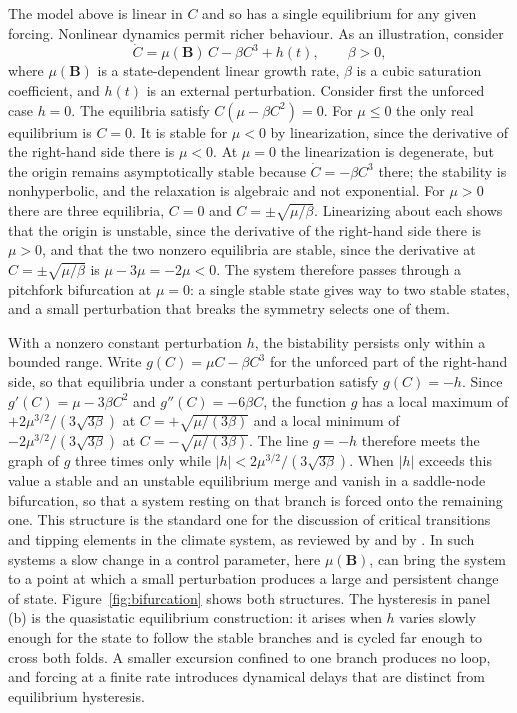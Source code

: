 \documentclass[11pt]{article}
\theoremstyle{definition}
\newcommand{\bB}{\mathbf{B}}
\begin{document}
The model above is linear in $C$ and so has a single equilibrium for any given forcing. Nonlinear dynamics permit richer behaviour. As an illustration, consider
\begin{equation}
\dot C = \mu(\bB)\,C - \beta C^3 + h(t), \qquad \beta > 0,
\label{eq:cubic}
\end{equation}
where $\mu(\bB)$ is a state-dependent linear growth rate, $\beta$ is a cubic saturation coefficient, and $h(t)$ is an external perturbation. Consider first the unforced case $h = 0$. The equilibria satisfy $C(\mu - \beta C^2) = 0$. For $\mu \le 0$ the only real equilibrium is $C = 0$. It is stable for $\mu < 0$ by linearization, since the derivative of the right-hand side there is $\mu < 0$. At $\mu = 0$ the linearization is degenerate, but the origin remains asymptotically stable because $\dot C = -\beta C^3$ there; the stability is nonhyperbolic, and the relaxation is algebraic and not exponential. For $\mu > 0$ there are three equilibria, $C = 0$ and $C = \pm\sqrt{\mu/\beta}$. Linearizing about each shows that the origin is unstable, since the derivative of the right-hand side there is $\mu > 0$, and that the two nonzero equilibria are stable, since the derivative at $C = \pm\sqrt{\mu/\beta}$ is $\mu - 3\mu = -2\mu < 0$. The system therefore passes through a pitchfork bifurcation at $\mu = 0$: a single stable state gives way to two stable states, and a small perturbation that breaks the symmetry selects one of them.

With a nonzero constant perturbation $h$, the bistability persists only within a bounded range. Write $g(C) = \mu C - \beta C^3$ for the unforced part of the right-hand side, so that equilibria under a constant perturbation satisfy $g(C) = -h$. Since $g'(C) = \mu - 3\beta C^2$ and $g''(C) = -6\beta C$, the function $g$ has a local maximum of $+2\mu^{3/2}/(3\sqrt{3\beta})$ at $C = +\sqrt{\mu/(3\beta)}$ and a local minimum of $-2\mu^{3/2}/(3\sqrt{3\beta})$ at $C = -\sqrt{\mu/(3\beta)}$. The line $g = -h$ therefore meets the graph of $g$ three times only while $|h| < 2\mu^{3/2}/(3\sqrt{3\beta})$. When $|h|$ exceeds this value a stable and an unstable equilibrium merge and vanish in a saddle-node bifurcation, so that a system resting on that branch is forced onto the remaining one. This structure is the standard one for the discussion of critical transitions and tipping elements in the climate system, as reviewed by \citet{lenton2008} and by \citet{scheffer2009}. In such systems a slow change in a control parameter, here $\mu(\bB)$, can bring the system to a point at which a small perturbation produces a large and persistent change of state. Figure~\ref{fig:bifurcation} shows both structures. The hysteresis in panel (b) is the quasistatic equilibrium construction: it arises when $h$ varies slowly enough for the state to follow the stable branches and is cycled far enough to cross both folds. A smaller excursion confined to one branch produces no loop, and forcing at a finite rate introduces dynamical delays that are distinct from equilibrium hysteresis.
\end{document}
